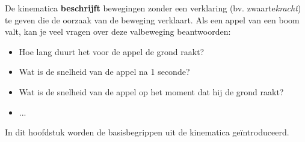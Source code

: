 \documentclass{ximera}
\begin{document}
	\author{Bart Lambregs}
    \xmsource\xmuitleg


De kinematica \textbf{beschrijft} bewegingen zonder een verklaring (bv. zwaarte\textit{kracht}) te geven die de oorzaak van de beweging verklaart. 
Als een appel van een boom valt, kan je veel vragen over deze valbeweging beantwoorden: 

\begin{itemize}
	\item Hoe lang duurt het voor de appel de grond raakt? 
	\item Wat is de snelheid van de appel na 1 seconde? 
	\item Wat is de snelheid van de appel op het moment dat hij de grond raakt? 
	\item ...
\end{itemize}

In dit hoofdstuk worden de basisbegrippen uit de kinematica geïntroduceerd. 




	
\end{document}
